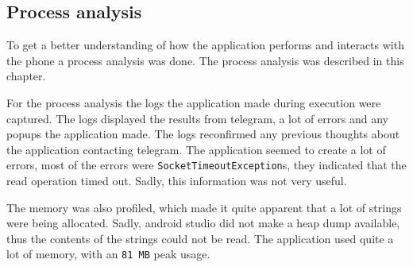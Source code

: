 \subsection{Process analysis}

To get a better understanding of how the application performs and interacts with the phone a process analysis was done.
The process analysis was described in this chapter.

For the process analysis the logs the application made during execution were captured.
The logs displayed the results from telegram, a lot of errors and any popups the application made.
The logs reconfirmed any previous thoughts about the application contacting telegram.
The application seemed to create a lot of errors, most of the errors were \texttt{SocketTimeoutException}s, they indicated that the read operation timed out.
Sadly, this information was not very useful.

The memory was also profiled, which made it quite apparent that a lot of strings were being allocated.
Sadly, android studio did not make a heap dump available, thus the contents of the strings could not be read.
The application used quite a lot of memory, with an \texttt{81 MB} peak usage.